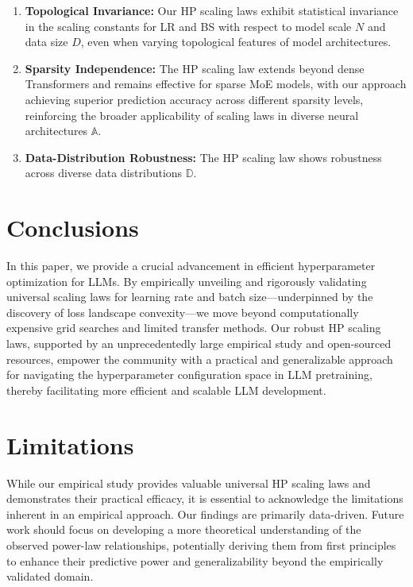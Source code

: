 \documentclass[11pt]{article}
\begin{document}
    \begin{tcolorbox}
        [callout={Key Takeaways}]
        \begin{enumerate}[\textbullet]
            \item \textbf{Topological Invariance:} Our HP scaling laws exhibit
                statistical invariance in the scaling constants for LR and BS
                with respect to model scale $N$ and data size $D$, even when varying
                topological features of model architectures.

            \item \textbf{Sparsity Independence:} The HP scaling law extends beyond dense Transformers and remains effective for sparse MoE models, with our approach achieving superior prediction accuracy across different sparsity levels, reinforcing the broader applicability of scaling laws in diverse neural architectures $\mathbb{A}$.

            \item \textbf{Data-Distribution Robustness:} The HP scaling law
                shows robustness across diverse data distributions $\mathbb{D}$.
        \end{enumerate}
    \end{tcolorbox}

    \section{Conclusions}
    In this paper, we provide a crucial advancement in efficient hyperparameter
    optimization for LLMs. By empirically unveiling and rigorously validating universal
    scaling laws for learning rate and batch size—underpinned by the discovery of
    loss landscape convexity—we move beyond computationally expensive grid searches
    and limited transfer methods. Our robust HP scaling laws, supported by an unprecedentedly
    large empirical study and open-sourced resources, empower the community with
    a practical and generalizable approach for navigating the hyperparameter
    configuration space in LLM pretraining, thereby facilitating more efficient and
    scalable LLM development.
    
    \section*{Limitations}
    \label{sec:limitation} While our empirical study provides valuable universal
    HP scaling laws and demonstrates their practical efficacy, it is essential
    to acknowledge the limitations inherent in an empirical approach. Our findings
    are primarily data-driven. Future work should focus on developing a more
    theoretical understanding of the observed power-law relationships, potentially
    deriving them from first principles to enhance their predictive power and generalizability
    beyond the empirically validated domain.
    
\end{document}
